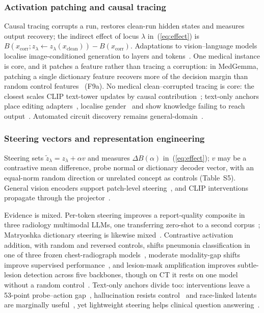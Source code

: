 \subsubsection{Activation patching and causal tracing}

Causal tracing corrupts a run, restores clean-run hidden states and measures output recovery; the
indirect effect of locus $\lambda$ in~(\ref{eq:effect}) is
$B(x_{\mathrm{corr}};z_\lambda\!\leftarrow\!z_\lambda(x_{\mathrm{clean}}))-B(x_{\mathrm{corr}})$.
Adaptations to vision--language models localise image-conditioned generation to layers and
tokens~\cite{palit2023towards,basu2024understanding,zhang2024cross,li2025causal}. One medical
instance is core, and it patches a feature rather than tracing a corruption: in MedGemma, patching a
single dictionary feature recovers more of the decision margin than random control
features~\cite{sadanandan2026mechanistically} (F9a). No medical clean--corrupted tracing is core: the
closest scales CLIP text-tower updates by causal contribution~\cite{abbasi2026layerspecific}; text-only anchors place editing
adapters~\cite{xu2024editing}, localise gender~\cite{ahsan2025elucidating} and show knowledge
failing to reach output~\cite{abouzahir2026bridging}. Automated circuit discovery remains
general-domain~\cite{conmy2023automated,syed2023attribution,marks2024sparse,ameisen2025circuit}.

\subsubsection{Steering vectors and representation engineering}

Steering sets $\tilde z_\lambda=z_\lambda+\alpha v$ and measures $\Delta B(\alpha)$
in~(\ref{eq:effect}); $v$ may be a contrastive mean difference, probe normal or dictionary decoder
vector, with an equal-norm random direction or unrelated concept as controls (Table~S5). General
vision encoders support patch-level steering~\cite{joseph2025steering,stevens2025interpretable}, and
CLIP interventions propagate through the projector~\cite{pach2025sparse}.

Evidence is mixed. Per-token steering improves a report-quality composite in three radiology
multimodal LLMs, one transferring zero-shot to a second corpus~\cite{nooralahzadeh2026universal};
Matryoshka dictionary steering is likewise mixed~\cite{bouzid2025insights}. Contrastive activation
addition, with random and reversed controls, shifts pneumonia classification in one of three frozen
chest-radiograph models~\cite{farina2026translating}, moderate modality-gap shifts improve
supervised performance~\cite{restrepo2026cone}, and lesion-mask amplification improves subtle-lesion
detection across five backbones, though on CT it rests on one model without a random
control~\cite{zeng2026easylens}. Text-only anchors divide too: interventions leave a 53-point
probe--action gap~\cite{basu2026interpretability}, hallucination resists
control~\cite{vankadaru2026readable} and race-linked latents are marginally
useful~\cite{ahsan2025can}, yet lightweight steering helps clinical question
answering~\cite{ray2026do}.

